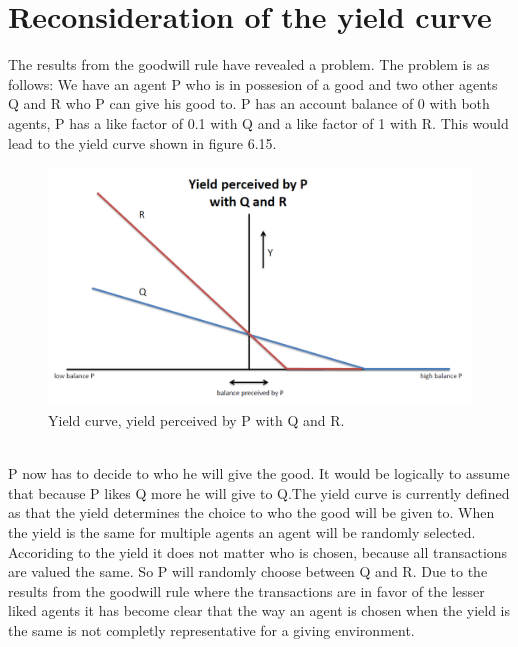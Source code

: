 \documentclass[twoside,openright]{uva-bachelor-thesis}
\begin{document}
\section{Reconsideration of the yield curve}
The results from the goodwill rule have revealed a problem. The problem is as follows: We have an agent P who is in possesion of a good and two other agents Q and R who P can give his good to. P has an account balance of 0 with both agents, P has a like factor of 0.1 with Q and a like factor of 1 with R. This would lead to the yield curve shown in figure 6.15. \\
\begin{figure}[h!]
    \centering
    \includegraphics[scale=0.4]{YieldCurves/yieldcurve_P_QR}
\caption{Yield curve, yield perceived by P with Q and R.}
\end{figure}
\\
P now has to decide to who he will give the good. It would be logically to assume that because P likes Q more he will give to Q.The yield curve is currently defined as that the yield determines the choice to who the good will be given to. When the yield is the same for multiple agents an agent will be randomly selected. Accoriding to the yield it does not matter who is chosen, because all transactions are valued the same. So P will randomly choose between Q and R. Due to the results from the goodwill rule where the transactions are in favor of the lesser liked agents it has become clear that the way an agent is chosen when the yield is the same is not completly representative for a giving environment.
\end{document}
